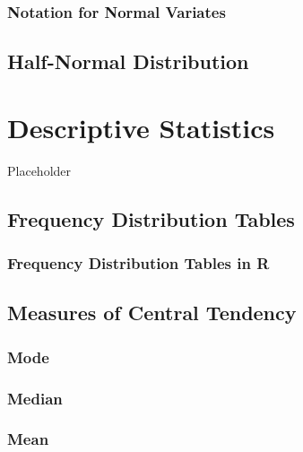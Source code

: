 \documentclass[
]{book}
\begin{document}
\hypertarget{notation-for-normal-variates}{%
\subsection{Notation for Normal Variates}\label{notation-for-normal-variates}}

\hypertarget{half-normal-distribution}{%
\section{Half-Normal Distribution}\label{half-normal-distribution}}

\hypertarget{descriptive-statistics}{%
\chapter{Descriptive Statistics}\label{descriptive-statistics}}

Placeholder

\hypertarget{frequency-distribution-tables}{%
\section{Frequency Distribution Tables}\label{frequency-distribution-tables}}

\hypertarget{frequency-distribution-tables-in-r}{%
\subsection{Frequency Distribution Tables in R}\label{frequency-distribution-tables-in-r}}

\hypertarget{measures-of-central-tendency}{%
\section{Measures of Central Tendency}\label{measures-of-central-tendency}}

\hypertarget{mode}{%
\subsection{Mode}\label{mode}}

\hypertarget{median}{%
\subsection{Median}\label{median}}

\hypertarget{mean}{%
\subsection{Mean}\label{mean}}
\end{document}
